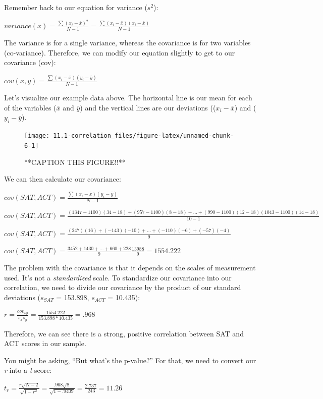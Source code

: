 \documentclass[
]{book}
\begin{document}
Remember back to our equation for variance (\(s^2\)):

\(variance (x) = \frac{\sum(x_i-\bar{x})^2}{N - 1} = \frac{\sum(x_i-\bar{x})(x_i-\bar{x})}{N - 1}\)

The variance is for a single variance, whereas the covariance is for two variables (co-variance). Therefore, we can modify our equation slightly to get to our covariance (cov):

\(cov(x,y) = \frac{\sum(x_i-\bar{x})(y_i-\bar{y})}{N - 1}\)

Let's visualize our example data above. The horizontal line is our mean for each of the variables (\(\bar{x}\) and \(\bar{y}\)) and the vertical lines are our deviations ((\(x_i - \bar{x}\)) and (\(y_i - \bar{y}\)).

\begin{figure}

{\centering \texttt{[image: 11.1-correlation\_files/figure-latex/unnamed-chunk-6-1]} 

}

\caption{**CAPTION THIS FIGURE!!**}\label{fig:unnamed-chunk-6}
\end{figure}

We can then calculate our covariance:

\(cov(SAT,ACT) = \frac{\sum(x_i-\bar{x})(y_i-\bar{y})}{N - 1}\)

\(cov(SAT,ACT) = \frac{(1347-1100)(34-18) + (957-1100)(8-18) + \ldots + (990-1100)(12-18)(1043-1100)(14-18)}{10 - 1}\)

\(cov(SAT,ACT) = \frac{(247)(16) + (-143)(-10) + \ldots + (-110)(-6) + (-57)(-4)}{9}\)

\(cov(SAT,ACT) = \frac{3452 + 1430 + \ldots + 660 + 228}{9} \frac{13988}{9} = 1554.222\)

The problem with the covariance is that it depends on the scales of measurement used. It's not a \emph{standardized} scale. To standardize our covariance into our correlation, we need to divide our covariance by the product of our standard deviations (\(s_{SAT}\) = 153.898, \(s_{ACT}\) = 10.435):

\(r = \frac{cov_{xy}}{s_x s_y} = \frac{1554.222}{153.898 *10.435} = .968\)

Therefore, we can see there is a strong, positive correlation between SAT and ACT scores in our sample.

You might be asking, ``But what's the p-value?'' For that, we need to convert our \emph{r} into a \emph{t}-score:

\(t_r = \frac{r \sqrt{N-2}}{\sqrt{1-r^2}} = \frac{.968 \sqrt{8}}{\sqrt{1-.9409}} = \frac{2.737}{.243} = 11.26\)
\end{document}
